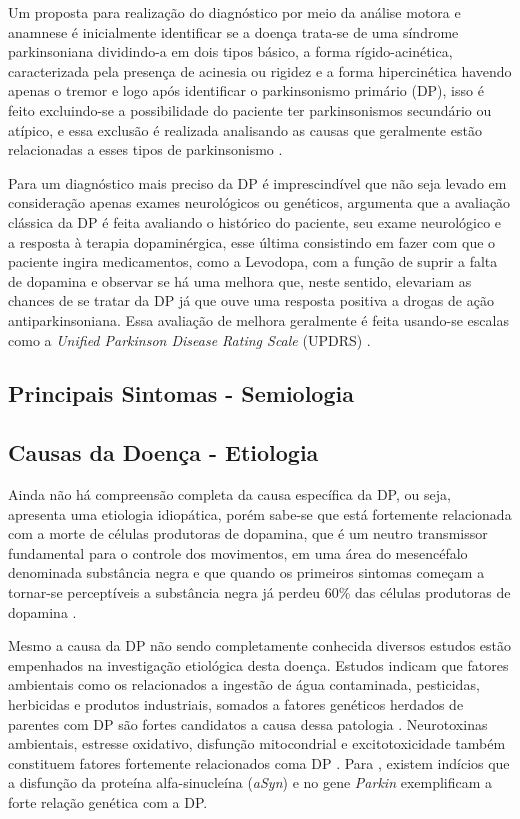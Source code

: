 \documentclass[
	12pt,				%
	openany,			%
	oneside,			%
	a4paper,			%
	english,			%
	french,				%
	spanish,			%
	brazil				%
	]{abntex2}
\begin{document}
Um proposta para realização do diagnóstico por meio da análise motora e anamnese é inicialmente identificar se a doença trata-se de uma síndrome parkinsoniana dividindo-a em dois tipos básico, a forma rígido-acinética, caracterizada pela presença de acinesia ou rigidez e a forma hipercinética havendo apenas o tremor e logo após identificar o parkinsonismo primário (DP), isso é feito excluindo-se a possibilidade do paciente ter parkinsonismos secundário ou atípico, e essa exclusão é realizada analisando as causas que geralmente estão relacionadas a esses tipos de parkinsonismo \cite{barbosa2005}.

Para um diagnóstico mais preciso da DP é imprescindível que não seja levado em consideração apenas exames neurológicos ou genéticos,  argumenta que a avaliação clássica da DP é feita avaliando o histórico do paciente, seu exame neurológico e a resposta à terapia dopaminérgica, esse última consistindo em fazer com que o paciente ingira medicamentos, como a Levodopa, com a função de suprir a falta de dopamina e observar se há uma melhora que, neste sentido, elevariam as chances de se tratar da DP já que ouve uma resposta positiva a drogas de ação antiparkinsoniana. Essa avaliação de melhora geralmente é feita usando-se escalas como a \textit{Unified Parkinson Disease Rating Scale} (UPDRS) \cite{reich2010}.

\subsection{Principais Sintomas - Semiologia}



\subsection{Causas da Doença - Etiologia}

Ainda não há compreensão completa da causa específica da DP, ou seja, apresenta uma etiologia idiopática, porém sabe-se que está fortemente relacionada com a morte de células produtoras de dopamina, que é um neutro transmissor fundamental para o controle dos movimentos, em uma área do mesencéfalo denominada substância negra e que quando os primeiros sintomas começam a tornar-se perceptíveis a substância negra já perdeu 60\% das células produtoras de dopamina \cite{moreira2007}.

Mesmo a causa da DP não sendo completamente conhecida diversos estudos estão empenhados na investigação etiológica desta doença. Estudos indicam que fatores ambientais como os relacionados a ingestão de água contaminada, pesticidas, herbicidas e produtos industriais, somados a fatores genéticos herdados de parentes com DP são fortes candidatos a causa dessa patologia \cite{jellinger2015, olanow2000}. Neurotoxinas ambientais, estresse oxidativo, disfunção mitocondrial e excitotoxicidade também constituem fatores fortemente relacionados coma DP \cite{barbosa2005}. Para , existem indícios que a disfunção da proteína alfa-sinucleína (\textit{aSyn}) e no gene \textit{Parkin} exemplificam a forte relação genética com a DP.
\end{document}
